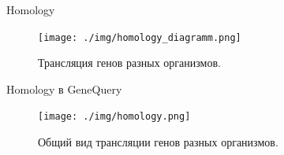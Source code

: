 \documentclass[10pt,pdf,utf8,russian,aspectratio=169]{beamer}
\begin{document}
\begin{frame}{Homology}
    \begin{figure}[p]
        \centering
        \caption{Трансляция генов разных организмов.}
        \texttt{[image: ./img/homology\_diagramm.png]}
    \end{figure}
\end{frame}

\begin{frame}{Homology в GeneQuery}
    \begin{figure}[p]
        \centering
        \caption{Общий вид трансляции генов разных организмов.}
        \texttt{[image: ./img/homology.png]}
    \end{figure}
\end{frame}



\end{document}
